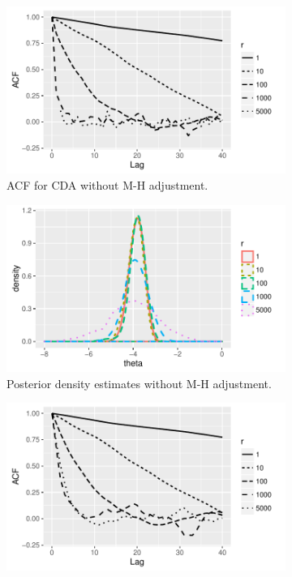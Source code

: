 \documentclass[12pt]{article}
\begin{document}
\begin{figure}[H]
  \begin{subfigure}[b]{0.32\textwidth}
 \includegraphics[width=1\textwidth]{probit_demo_acf_prop.pdf}
  \caption{ACF for CDA without M-H adjustment.}
 \label{probit_demo_intercept_proposal}
\end{subfigure}
  \hfill
    \begin{subfigure}[b]{0.32\textwidth}
 \includegraphics[width=1\textwidth]{density_probit.pdf}
  \caption{Posterior density estimates without M-H adjustment.}
   \label{probit_demo_intercept_density}
\end{subfigure}
\hfill
   \begin{subfigure}[b]{0.32\textwidth}
 \includegraphics[width=1\textwidth]{probit_demo_acf.pdf}

\end{subfigure}
\end{figure}
\end{document}
